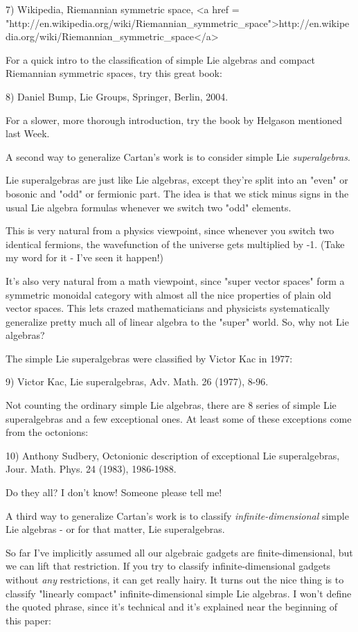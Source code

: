7) Wikipedia, Riemannian symmetric space,
<a href = "http://en.wikipedia.org/wiki/Riemannian_symmetric_space">http://en.wikipedia.org/wiki/Riemannian_symmetric_space</a>

For a quick intro to the classification of simple Lie algebras and 
compact Riemannian symmetric spaces, try this great book:

8) Daniel Bump, Lie Groups, Springer, Berlin, 2004.

For a slower, more thorough introduction, try the book by Helgason
mentioned last Week.

A second way to generalize Cartan's work is to consider simple 
Lie \emph{superalgebras}.  

Lie superalgebras are just like Lie algebras, except they're split
into an "even" or bosonic and "odd" or fermionic
part.  The idea is that we stick minus signs in the usual Lie algebra
formulas whenever we switch two "odd" elements.

This is very natural from a physics viewpoint, since whenever 
you switch two identical fermions, the wavefunction of the 
universe gets multiplied by -1.  (Take my word for it - I've seen 
it happen!)

It's also very natural from a math viewpoint, since "super vector
spaces" form a symmetric monoidal category with almost all the
nice properties of plain old vector spaces.  This lets crazed
mathematicians and physicists systematically generalize pretty much
all of linear algebra to the "super" world.  So, why not Lie
algebras?

The simple Lie superalgebras were classified by Victor Kac in 
1977:

9) Victor Kac, Lie superalgebras, Adv. Math. 26 (1977), 8-96.

Not counting the ordinary simple Lie algebras, there are 8 
series of simple Lie superalgebras and a few exceptional ones.  
At least some of these exceptions come from the octonions:

10)  Anthony Sudbery, Octonionic description of exceptional 
Lie superalgebras, Jour. Math. Phys. 24 (1983), 1986-1988.

Do they all?  I don't know!  Someone please tell me!

A third way to generalize Cartan's work is to classify 
\emph{infinite-dimensional} simple Lie algebras - or for that matter,
Lie superalgebras.

So far I've implicitly assumed all our algebraic gadgets are 
finite-dimensional, but we can lift that restriction.   If you 
try to classify infinite-dimensional gadgets without \emph{any} 
restrictions, it can get really hairy.  It turns out the nice 
thing is to classify "linearly compact" infinite-dimensional 
simple Lie algebras.  I won't define the quoted phrase, since 
it's technical and it's explained near the beginning 
of this paper:


